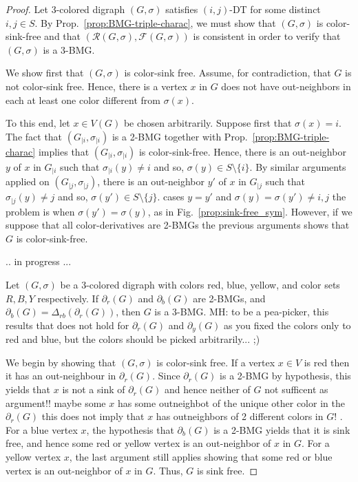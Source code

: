 \documentclass[final,3p,times]{elsarticle}
\newcommand{\TODO}[1]{\begingroup\color{red}#1\endgroup}
\newcommand{\ak}[1]{\begingroup\color{orange}#1\endgroup}
\newcommand{\OLD}[1]{\begingroup\tiny\color{gray}#1\endgroup}
\newcommand{\mh}[1]{\begingroup\color{blue}#1\endgroup}
\begin{document}
\begin{proof}
\mh{
Let 3-colored digraph $(G,\sigma)$ satisfies $(i,j)$-DT for some distinct
$i,j\in S$. By Prop.\ \ref{prop:BMG-triple-charac}, we must show that
$(G,\sigma)$ is color-sink-free and that
$(\mathscr{R}(G,\sigma),\mathscr{F}(G,\sigma))$ is consistent in order to verify
that $(G,\sigma)$ is a 3-BMG.
  
We show first that $(G,\sigma)$ is color-sink free.  Assume, for contradiction, that 
$G$ is not  color-sink free. Hence, there is a vertex $x$ in $G$ does not have 
out-neighbors in \OLD{each} \ak{at least one} color different from $\sigma(x)$.




To this end, let $x\in V(G)$
be chosen arbitrarily.
Suppose first that $\sigma(x)=i$. The fact that
$(G_{|i},\sigma_{|i})$ is a 2-BMG together with Prop.\
\ref{prop:BMG-triple-charac} implies that $(G_{|i},\sigma_{|i})$ is
color-sink-free. Hence, there is an out-neighbor $y$ of $x$ in $G_{|i}$ such
that $\sigma_{|i}(y)\neq i$ and so, $\sigma(y)\in S\setminus \{i\}$.
By similar arguments applied on $(G_{|j},\sigma_{|j})$, 
there is an out-neighbor $y'$ of $x$ in $G_{|j}$ such
that $\sigma_{|j}(y)\neq j$ and so, $\sigma(y')\in S\setminus \{j\}$.
\TODO{cases $y=y'$ and $\sigma(y)=\sigma(y')\neq i,j$}
\ak{the problem is when $\sigma(y')=\sigma(y)$, as in Fig.~\ref{prop:sink-free_sym}. However, if we suppose that all color-derivatives are 2-BMGs the previous arguments shows that $G$ is color-sink-free.}

}




\TODO{.. in progress ... }

Let $(G,\sigma)$ be a 3-colored digraph with colors red, blue, yellow, and color sets $R,B,Y$ respectively. If $\partial_r(G)$ and $\partial_b(G)$ are 2-BMGs, and $\partial_b(G)=\Delta_{rb}(\partial_r(G))$, then $G$ is a 3-BMG. \TODO{MH: to be a pea-picker, this results that does not hold
for  $\partial_r(G)$ and $\partial_y(G)$ as you fixed the colors only to red and blue, but the colors should be picked arbitrarily... ;)  }


We begin by showing that $(G,\sigma)$ is color-sink free. If a vertex $x\in V$ is red then it has an out-neighbour in $\partial_{r}(G)$. Since $\partial_{r}(G)$ is a 2-BMG by hypothesis, this yields that $x$ is not a sink of $\partial_{r}(G)$ and hence neither of $G$
\TODO{not sufficent as argument!! maybe some $x$ has some outneighbot of the unique other color in the $\partial_{r}(G)$ this does not imply that $x$ has outneighbors of 2 different colors in $G$!}
. For a blue vertex $x$, the hypothesis that $\partial_b(G)$ is a 2-BMG yields that it is sink free, and hence some red or yellow vertex is an out-neighbor of $x$ in $G$. For a yellow vertex $x$, the last argument still applies showing that some red or blue vertex is an out-neighbor of $x$ in $G$. Thus, $G$ is sink free.


\end{proof}
\end{document}
